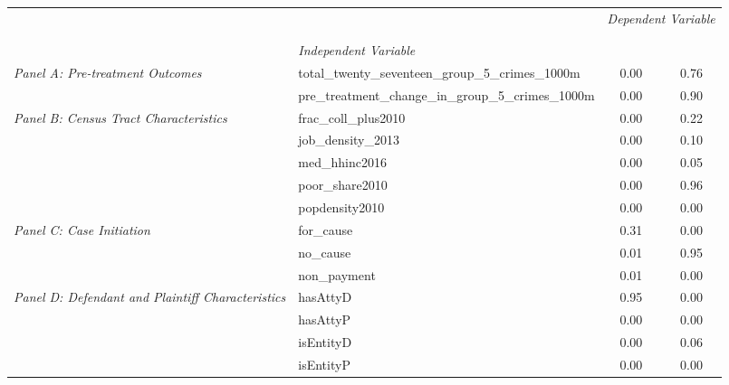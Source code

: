 \begin{tabular}{llcc}
\toprule
 &  & \multicolumn{2}{c}{\textit{Dependent Variable}} \\
\cline{3-4}
\\
 &  &  &  \\
 & \emph{Independent Variable} &  &  \\
\midrule
\multirow[c]{2}{3cm}{\textit{Panel A: Pre-treatment Outcomes}} & total_twenty_seventeen_group_5_crimes_1000m & 0.00 & 0.76 \\
 & pre_treatment_change_in_group_5_crimes_1000m & 0.00 & 0.90 \\
\cline{1-4}
\multirow[c]{5}{3cm}{\textit{Panel B: Census Tract Characteristics}} & frac_coll_plus2010 & 0.00 & 0.22 \\
 & job_density_2013 & 0.00 & 0.10 \\
 & med_hhinc2016 & 0.00 & 0.05 \\
 & poor_share2010 & 0.00 & 0.96 \\
 & popdensity2010 & 0.00 & 0.00 \\
\cline{1-4}
\multirow[c]{3}{3cm}{\textit{Panel C: Case Initiation}} & for_cause & 0.31 & 0.00 \\
 & no_cause & 0.01 & 0.95 \\
 & non_payment & 0.01 & 0.00 \\
\cline{1-4}
\multirow[c]{4}{3cm}{\textit{Panel D: Defendant and Plaintiff Characteristics}} & hasAttyD & 0.95 & 0.00 \\
 & hasAttyP & 0.00 & 0.00 \\
 & isEntityD & 0.00 & 0.06 \\
 & isEntityP & 0.00 & 0.00 \\
\cline{1-4}
\bottomrule
\end{tabular}
